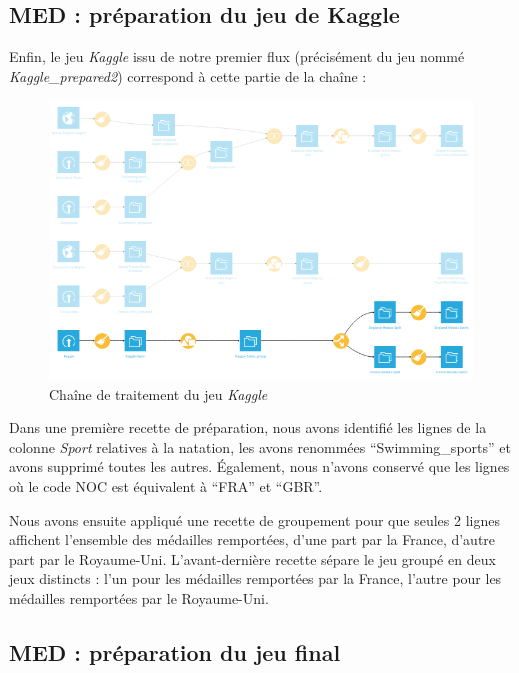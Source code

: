 \documentclass[hidelinks, 12pt]{report}
\begin{document}
%





\subsection{MED : préparation du jeu de Kaggle}

Enfin, le jeu \textit{Kaggle} issu de notre premier flux (précisément du jeu nommé \textit{Kaggle\_prepared2}) correspond à cette partie de la chaîne :

\begin{center}
	\begin{figure}[H]
		\centering
		\setlength{\belowcaptionskip}{-35pt}
		\includegraphics[scale=0.5]{images/flow-swim-kaggle.png}
		\caption{Chaîne de traitement du jeu \textit{Kaggle}}
	\end{figure}
\end{center}

Dans une première recette de préparation, nous avons identifié les lignes de la colonne \textit{Sport} relatives à la natation, les avons renommées \enquote{Swimming\_sports} et avons supprimé toutes les autres. Également, nous n'avons conservé que les lignes où le code NOC est équivalent à \enquote{FRA} et \enquote{GBR}.

Nous avons ensuite appliqué une recette de groupement pour que seules 2 lignes affichent l'ensemble des médailles remportées, d'une part par la France, d'autre part par le Royaume-Uni. L'avant-dernière recette sépare le jeu groupé en deux jeux distincts : l'un pour les médailles remportées par la France, l'autre pour les médailles remportées par le Royaume-Uni.

\subsection{MED : préparation du jeu final}
\end{document}
